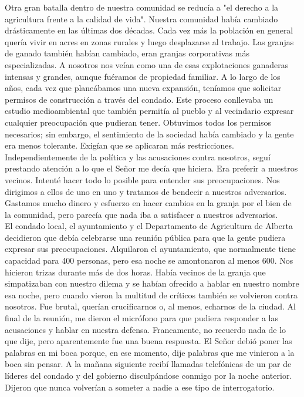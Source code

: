 \documentclass[twoside, 12pt]{book}
\begin{document}
Otra gran batalla dentro de nuestra comunidad se reducía a "el derecho a la agricultura frente a la calidad de vida". Nuestra comunidad había cambiado drásticamente en las últimas dos décadas. Cada vez más la población en general quería vivir en acres en zonas rurales y luego desplazarse al trabajo. Las granjas de ganado también habían cambiado, eran granjas corporativas más especializadas. A nosotros nos veían como una de esas explotaciones ganaderas intensas y grandes, aunque fuéramos de propiedad familiar. A lo largo de los años, cada vez que planeábamos una nueva expansión, teníamos que solicitar permisos de construcción a través del condado. Este proceso conllevaba un estudio medioambiental que también permitía al pueblo y al vecindario expresar cualquier preocupación que pudieran tener. Obtuvimos todos los permisos necesarios; sin embargo, el sentimiento de la sociedad había cambiado y la gente era menos tolerante. Exigían que se aplicaran más restricciones. Independientemente de la política y las acusaciones contra nosotros, seguí prestando atención a lo que el Señor me decía que hiciera. Era preferir a nuestros vecinos. Intenté hacer todo lo posible para entender sus preocupaciones. Nos dirigimos a ellos de uno en uno y tratamos de bendecir a nuestros adversarios. Gastamos mucho dinero y esfuerzo en hacer cambios en la granja por el bien de la comunidad, pero parecía que nada iba a satisfacer a nuestros adversarios.\\

El condado local, el ayuntamiento y el Departamento de Agricultura de Alberta decidieron que debía celebrarse una reunión pública para que la gente pudiera expresar sus preocupaciones. Alquilaron el ayuntamiento, que normalmente tiene capacidad para 400 personas, pero esa noche se amontonaron al menos 600. Nos hicieron trizas durante más de dos horas. Había vecinos de la granja que simpatizaban con nuestro dilema y se habían ofrecido a hablar en nuestro nombre esa noche, pero cuando vieron la multitud de críticos también se volvieron contra nosotros. Fue brutal, querían crucificarnos o, al menos, echarnos de la ciudad. Al final de la reunión, me dieron el micrófono para que pudiera responder a las acusaciones y hablar en nuestra defensa. Francamente, no recuerdo nada de lo que dije, pero aparentemente fue una buena respuesta. El Señor debió poner las palabras en mi boca porque, en ese momento, dije palabras que me vinieron a la boca sin pensar. A la mañana siguiente recibí llamadas telefónicas de un par de líderes del condado y del gobierno disculpándose conmigo por la noche anterior. Dijeron que nunca volverían a someter a nadie a ese tipo de interrogatorio.\\
\end{document}
